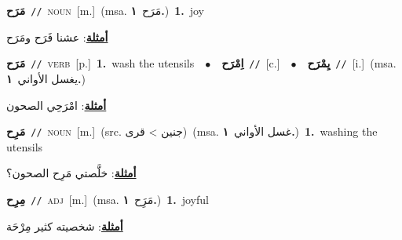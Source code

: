 \documentclass[10pt,a4paper,twoside]{article} %
\begin{document}
\begin{multicols}{2}
{\setlength\topsep{0pt}\textbf{\foreignlanguage{arabic}{مَرَح}}\ {\color{gray}\texttt{//}\color{black}}\ \textsc{noun}\ [m.]\ \color{gray}(msa. \foreignlanguage{arabic}{مَرَح}~\foreignlanguage{arabic}{\textbf{١.}})\color{black}\ \textbf{1.}~joy\  \begin{flushright}\color{gray}\foreignlanguage{arabic}{\textbf{\underline{\foreignlanguage{arabic}{أمثلة}}}: عشنا فَرَح ومَرَح}\end{flushright}\color{black}} \vspace{2mm}

{\setlength\topsep{0pt}\textbf{\foreignlanguage{arabic}{مَرَح}}\ {\color{gray}\texttt{//}\color{black}}\ \textsc{verb}\ [p.]\ \textbf{1.}~wash the utensils\ \ $\bullet$\ \ \setlength\topsep{0pt}\textbf{\foreignlanguage{arabic}{اِمْرَح}}\ {\color{gray}\texttt{//}\color{black}}\ [c.]\ \ $\bullet$\ \ \setlength\topsep{0pt}\textbf{\foreignlanguage{arabic}{يِمْرَح}}\ {\color{gray}\texttt{//}\color{black}}\ [i.]\ \color{gray}(msa. \foreignlanguage{arabic}{يغسل الأواني}~\foreignlanguage{arabic}{\textbf{١.}})\color{black}\  \begin{flushright}\color{gray}\foreignlanguage{arabic}{\textbf{\underline{\foreignlanguage{arabic}{أمثلة}}}: امْرَحِي الصحون}\end{flushright}\color{black}} \vspace{2mm}

{\setlength\topsep{0pt}\textbf{\foreignlanguage{arabic}{مَرِح}}\ {\color{gray}\texttt{//}\color{black}}\ \textsc{noun}\ [m.]\ (src. \color{gray}\foreignlanguage{arabic}{جنين > قرى}\color{black})\ \color{gray}(msa. \foreignlanguage{arabic}{غسل الأواني}~\foreignlanguage{arabic}{\textbf{١.}})\color{black}\ \textbf{1.}~washing the utensils\  \begin{flushright}\color{gray}\foreignlanguage{arabic}{\textbf{\underline{\foreignlanguage{arabic}{أمثلة}}}: خلَّصتي مَرِح الصحون؟}\end{flushright}\color{black}} \vspace{2mm}

{\setlength\topsep{0pt}\textbf{\foreignlanguage{arabic}{مِرِح}}\ {\color{gray}\texttt{//}\color{black}}\ \textsc{adj}\ [m.]\ \color{gray}(msa. \foreignlanguage{arabic}{مَرَِح}~\foreignlanguage{arabic}{\textbf{١.}})\color{black}\ \textbf{1.}~joyful\  \begin{flushright}\color{gray}\foreignlanguage{arabic}{\textbf{\underline{\foreignlanguage{arabic}{أمثلة}}}: شخصيته كثير مِرْحَة}\end{flushright}\color{black}} \vspace{2mm}


\end{multicols}
\end{document}
